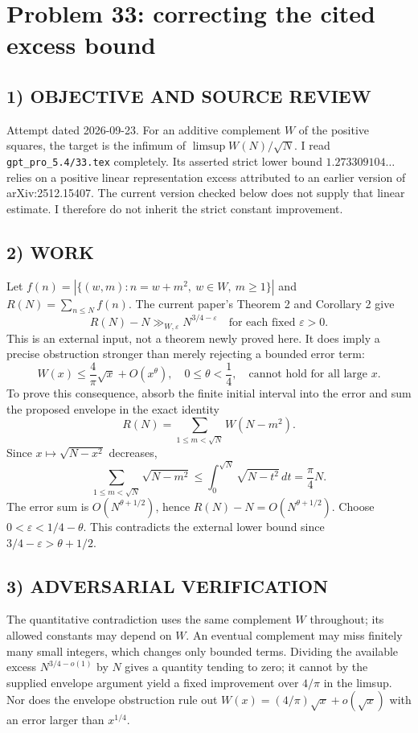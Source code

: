 \section{Problem 33: correcting the cited excess bound}
\subsection*{1) OBJECTIVE AND SOURCE REVIEW}
Attempt dated 2026-09-23. For an additive complement $W$ of the positive squares, the target is the infimum of $\limsup W(N)/\sqrt N$. I read \texttt{gpt\_pro\_5.4/33.tex} completely. Its asserted strict lower bound $1.273309104\ldots$ relies on a positive linear representation excess attributed to an earlier version of arXiv:2512.15407. The current version checked below does not supply that linear estimate. I therefore do not inherit the strict constant improvement.
\subsection*{2) WORK}
Let $f(n)=|\{(w,m):n=w+m^2,\ w\in W,\ m\ge1\}|$ and $R(N)=\sum_{n\le N}f(n)$. The current paper's Theorem 2 and Corollary 2 give
\[
R(N)-N\gg_{W,\varepsilon}N^{3/4-\varepsilon}
\quad\text{for each fixed }\varepsilon>0.
\]
This is an external input, not a theorem newly proved here. It does imply a precise obstruction stronger than merely rejecting a bounded error term:
\[
W(x)\le\frac4\pi\sqrt x+O(x^\theta),\quad 0\le\theta<\frac14,
\quad\text{cannot hold for all large }x.
\]
To prove this consequence, absorb the finite initial interval into the error and sum the proposed envelope in the exact identity
\[
R(N)=\sum_{1\le m<\sqrt N}W(N-m^2).
\]
Since $x\mapsto\sqrt{N-x^2}$ decreases,
\[
\sum_{1\le m<\sqrt N}\sqrt{N-m^2}\le\int_0^{\sqrt N}\sqrt{N-t^2}\,dt=\frac\pi4N.
\]
The error sum is $O(N^{\theta+1/2})$, hence $R(N)-N=O(N^{\theta+1/2})$. Choose $0<\varepsilon<1/4-\theta$. This contradicts the external lower bound since $3/4-\varepsilon>\theta+1/2$.
\subsection*{3) ADVERSARIAL VERIFICATION}
The quantitative contradiction uses the same complement $W$ throughout; its allowed constants may depend on $W$. An eventual complement may miss finitely many small integers, which changes only bounded terms. Dividing the available excess $N^{3/4-o(1)}$ by $N$ gives a quantity tending to zero; it cannot by the supplied envelope argument yield a fixed improvement over $4/\pi$ in the limsup. Nor does the envelope obstruction rule out $W(x)=(4/\pi)\sqrt x+o(\sqrt x)$ with an error larger than $x^{1/4}$.
